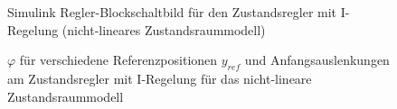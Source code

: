 \documentclass[
	pagesize,
	fontsize=12pt,
	paper=a4,
	oneside,
   reqno
]{scrartcl}
\begin{document}
\begin{figure}[H]
    \centering
    \caption[Regler mit I-Regelung Simulink (nicht-linear)]{Simulink Regler-Blockschaltbild für den Zustandsregler mit I-Regelung (nicht-lineares Zustandsraummodell)}
    \label{fig:Bild26.5}
\end{figure}

\begin{figure}[H]
    \centering
    \caption[$\varphi$ für Regler mit I-Regelung (nicht-linear)]{$\varphi$ für verschiedene Referenzpositionen $y_{ref}$ und Anfangsauslenkungen am Zustandsregler mit I-Regelung für das nicht-lineare Zustandsraummodell}
    \label{fig:Bild27}
\end{figure}
\end{document}
